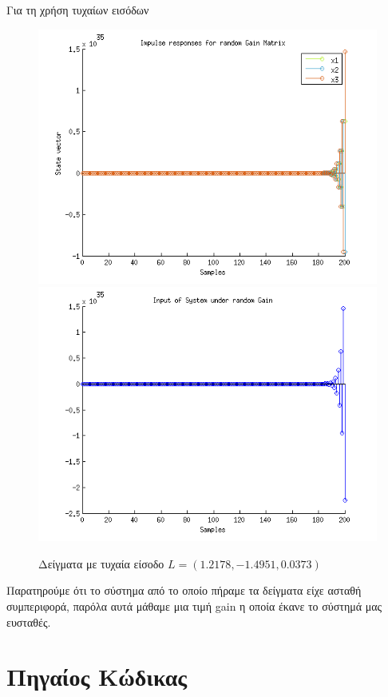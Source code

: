 \documentclass[a4paper,oneside,12pt]{article}
\begin{document}
Για τη χρήση τυχαίων εισόδων
\begin{figure}[H]
\centering
\includegraphics[scale=1.0]{random_state.png} \\
\includegraphics[scale=1.0]{random_input.png}
\caption{Δείγματα με τυχαία είσοδο $L = (1.2178,   -1.4951,    0.0373)$}
\label{}
\end{figure}

Παρατηρούμε ότι το σύστημα από το οποίο πήραμε τα δείγματα είχε ασταθή συμπεριφορά, παρόλα αυτά μάθαμε μια τιμή gain η οποία έκανε το σύστημά μας ευσταθές. 

\section{Πηγαίος Κώδικας}
\end{document}
